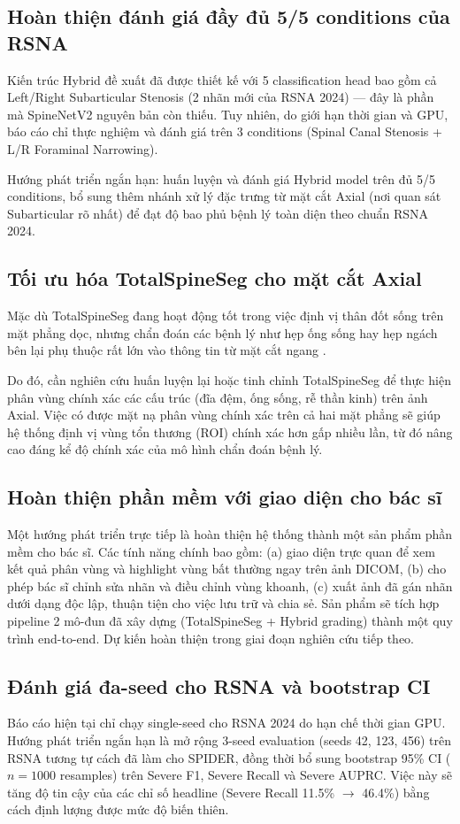 \subsection{Hoàn thiện đánh giá đầy đủ 5/5 conditions của RSNA}
Kiến trúc Hybrid đề xuất đã được thiết kế với 5 classification head bao gồm cả Left/Right Subarticular Stenosis (2 nhãn mới của RSNA 2024) --- đây là phần mà SpineNetV2 nguyên bản còn thiếu. Tuy nhiên, do giới hạn thời gian và GPU, báo cáo chỉ thực nghiệm và đánh giá trên 3 conditions (Spinal Canal Stenosis + L/R Foraminal Narrowing).

Hướng phát triển ngắn hạn: huấn luyện và đánh giá Hybrid model trên đủ 5/5 conditions, bổ sung thêm nhánh xử lý đặc trưng từ mặt cắt Axial (nơi quan sát Subarticular rõ nhất) để đạt độ bao phủ bệnh lý toàn diện theo chuẩn RSNA 2024.

\subsection{Tối ưu hóa TotalSpineSeg cho mặt cắt Axial}
Mặc dù TotalSpineSeg đang hoạt động tốt trong việc định vị thân đốt sống trên mặt phẳng dọc, nhưng chẩn đoán các bệnh lý như hẹp ống sống hay hẹp ngách bên lại phụ thuộc rất lớn vào thông tin từ mặt cắt ngang .

Do đó, cần nghiên cứu huấn luyện lại hoặc tinh chỉnh  TotalSpineSeg để thực hiện phân vùng chính xác các cấu trúc (đĩa đệm, ống sống, rễ thần kinh) trên ảnh Axial. Việc có được mặt nạ phân vùng chính xác trên cả hai mặt phẳng sẽ giúp hệ thống định vị vùng tổn thương (ROI) chính xác hơn gấp nhiều lần, từ đó nâng cao đáng kể độ chính xác của mô hình chẩn đoán bệnh lý.

\subsection{Hoàn thiện phần mềm với giao diện cho bác sĩ}
Một hướng phát triển trực tiếp là hoàn thiện hệ thống thành một sản phẩm phần mềm cho bác sĩ. Các tính năng chính bao gồm: (a) giao diện trực quan để xem kết quả phân vùng và highlight vùng bất thường ngay trên ảnh DICOM, (b) cho phép bác sĩ chỉnh sửa nhãn và điều chỉnh vùng khoanh, (c) xuất ảnh đã gán nhãn dưới dạng độc lập, thuận tiện cho việc lưu trữ và chia sẻ. Sản phẩm sẽ tích hợp pipeline 2 mô-đun đã xây dựng (TotalSpineSeg + Hybrid grading) thành một quy trình end-to-end. Dự kiến hoàn thiện trong giai đoạn nghiên cứu tiếp theo.

\subsection{Đánh giá đa-seed cho RSNA và bootstrap CI}
Báo cáo hiện tại chỉ chạy single-seed cho RSNA 2024 do hạn chế thời gian GPU. Hướng phát triển ngắn hạn là mở rộng 3-seed evaluation (seeds 42, 123, 456) trên RSNA tương tự cách đã làm cho SPIDER, đồng thời bổ sung bootstrap 95\% CI ($n = 1000$ resamples) trên Severe F1, Severe Recall và Severe AUPRC. Việc này sẽ tăng độ tin cậy của các chỉ số headline (Severe Recall 11.5\% $\rightarrow$ 46.4\%) bằng cách định lượng được mức độ biến thiên.

